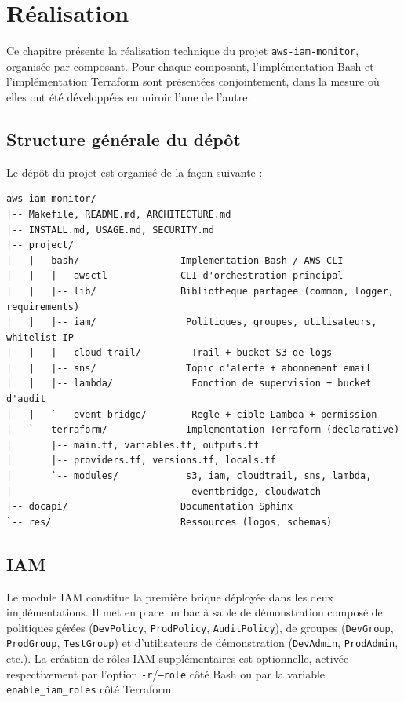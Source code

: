 \documentclass[11pt,a4paper]{report}
\begin{document}
\chapter{Réalisation}

Ce chapitre présente la réalisation technique du projet \texttt{aws-iam-monitor}, organisée par composant. Pour chaque composant, l'implémentation Bash et l'implémentation Terraform sont présentées conjointement, dans la mesure où elles ont été développées en miroir l'une de l'autre.

\section{Structure générale du dépôt}

Le dépôt du projet est organisé de la façon suivante :

\begin{lstlisting}
aws-iam-monitor/
|-- Makefile, README.md, ARCHITECTURE.md
|-- INSTALL.md, USAGE.md, SECURITY.md
|-- project/
|   |-- bash/                  Implementation Bash / AWS CLI
|   |   |-- awsctl             CLI d'orchestration principal
|   |   |-- lib/               Bibliotheque partagee (common, logger, requirements)
|   |   |-- iam/                Politiques, groupes, utilisateurs, whitelist IP
|   |   |-- cloud-trail/         Trail + bucket S3 de logs
|   |   |-- sns/                Topic d'alerte + abonnement email
|   |   |-- lambda/              Fonction de supervision + bucket d'audit
|   |   `-- event-bridge/        Regle + cible Lambda + permission
|   `-- terraform/              Implementation Terraform (declarative)
|       |-- main.tf, variables.tf, outputs.tf
|       |-- providers.tf, versions.tf, locals.tf
|       `-- modules/            s3, iam, cloudtrail, sns, lambda,
|                                eventbridge, cloudwatch
|-- docapi/                    Documentation Sphinx
`-- res/                       Ressources (logos, schemas)
\end{lstlisting}

\section{IAM}

Le module IAM constitue la première brique déployée dans les deux implémentations. Il met en place un bac à sable de démonstration composé de politiques gérées (\texttt{DevPolicy}, \texttt{ProdPolicy}, \texttt{AuditPolicy}), de groupes (\texttt{DevGroup}, \texttt{ProdGroup}, \texttt{TestGroup}) et d'utilisateurs de démonstration (\texttt{DevAdmin}, \texttt{ProdAdmin}, etc.). La création de rôles IAM supplémentaires est optionnelle, activée respectivement par l'option \texttt{-r}/\texttt{--role} côté Bash ou par la variable \texttt{enable\_iam\_roles} côté Terraform.
\end{document}
